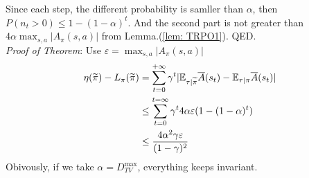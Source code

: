 \documentclass[11pt,a4paper]{article}
\def\tilde{\widetilde}
\def\epsilon{\varepsilon}
\def\tilde{\widetilde}
\def\bar{\overline}
\def\E{\mathbb{E}}
\begin{document}
Since each step, the different probability is samller than $\alpha$, then $P(n_t>0) \le 1 - (1-\alpha)^t$. And the second part is not greater than $4\alpha \max_{s,a}|A_{\pi}(s,a)|$ from Lemma.(\ref{lem: TRPO1}).
QED.\\ 
\emph{Proof of Theorem}:
Use $\epsilon = \max_{s,a}|A_{\pi}(s,a)|$
\begin{equation}
\aligned 
\eta(\tilde{\pi}) - L_{\pi}(\tilde{\pi}) & = \sum_{t=0}^{+\infty} \gamma^t |\E_{\tau|\tilde{\pi}}\bar{A}(s_t) - \E_{\tau|\pi}\bar{A}(s_t)| \\ 
& \le \sum_{t=0}^{t=\infty} \gamma^t 4\alpha \epsilon (1-(1-\alpha)^t) \\ 
& \le \frac{4\alpha^2\gamma \epsilon}{(1-\gamma)^2}
\endaligned
\end{equation}
Obivously, if we take $\alpha = D_{TV}^{\max}$, everything keeps invariant.
\end{document}
